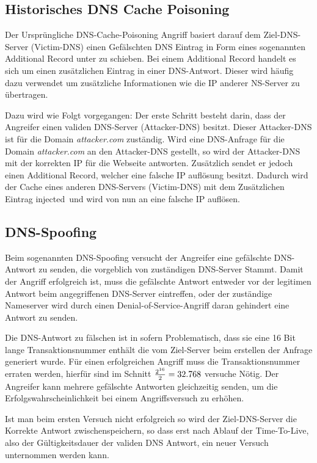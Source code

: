 \documentclass[10pt,a4paper]{article}
\begin{document}
\subsection{Historisches DNS Cache Poisoning}
Der Ursprüngliche DNS-Cache-Poisoning Angriff basiert darauf dem Ziel-DNS-Server (Victim-DNS) einen Gefälschten DNS Eintrag in Form eines sogenannten Additional Record unter zu schieben. Bei einem Additional Record handelt es sich um einen zusätzlichen Eintrag in einer DNS-Antwort. Dieser wird häufig dazu verwendet um zusätzliche Informationen wie die IP anderer NS-Server zu übertragen.

Dazu wird wie Folgt vorgegangen: Der erste Schritt besteht darin, dass der Angreifer einen validen DNS-Server (Attacker-DNS) besitzt. Dieser Attacker-DNS ist für die Domain \emph{attacker.com} zuständig. Wird eine DNS-Anfrage für die Domain \emph{attacker.com} an den Attacker-DNS gestellt, so wird der Attacker-DNS mit der korrekten IP für die Webseite antworten. Zusätzlich sendet er jedoch einen Additional Record, welcher eine falsche IP auflösung besitzt. Dadurch wird der Cache eines anderen DNS-Servers (Victim-DNS) mit dem Zusätzlichen Eintrag \glqq injected\grqq\ und wird von nun an eine falsche IP auflösen.

\subsection{DNS-Spoofing}
Beim sogenannten DNS-Spoofing versucht der Angreifer eine gefälschte DNS-Antwort zu senden, die vorgeblich von zuständigen DNS-Server Stammt. Damit der Angriff erfolgreich ist, muss die gefälschte Antwort entweder vor der legitimen Antwort beim angegriffenen DNS-Server eintreffen, oder der zuständige Nameserver wird durch einen Denial-of-Service-Angriff daran gehindert eine Antwort zu senden.

Die DNS-Antwort zu fälschen ist in sofern Problematisch, dass sie eine 16 Bit lange Transaktionsnummer enthält die vom Ziel-Server beim erstellen der Anfrage generiert wurde. Für einen erfolgreichen Angriff muss die Transaktionsnummer erraten werden, hierfür sind im Schnitt $\displaystyle \textstyle {\frac {2^{16}}{2}}=32.768$ versuche Nötig. Der Angreifer kann mehrere gefälschte Antworten gleichzeitig senden, um die Erfolgswahrscheinlichkeit bei einem Angriffsversuch zu erhöhen.

Ist man beim ersten Versuch nicht erfolgreich so wird der Ziel-DNS-Server die Korrekte Antwort zwischenspeichern, so dass erst nach Ablauf der Time-To-Live, also der Gültigkeitsdauer der validen DNS Antwort, ein neuer Versuch unternommen werden kann.
\end{document}
